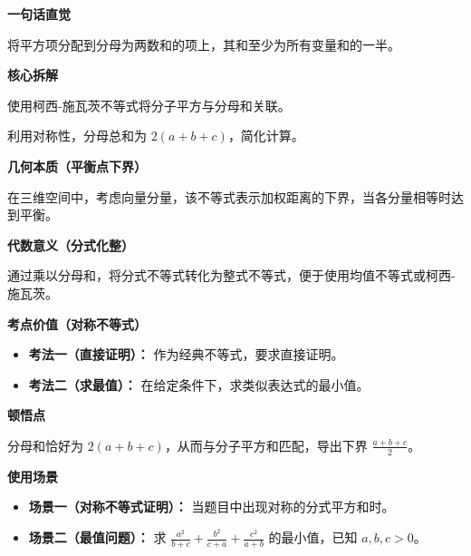 \begin{explanationbox}
\textbf{\textcolor{CExplanation}{一句话直觉}}

将平方项分配到分母为两数和的项上，其和至少为所有变量和的一半。

\medskip
\textbf{\textcolor{CExplanation}{核心拆解}}
\begin{description}[style=nextline, leftmargin=2.8em, labelsep=0.5em, itemsep=0.45em]
    \item[\textbf{要点一（柯西-施瓦茨应用）：}] 使用柯西-施瓦茨不等式将分子平方与分母和关联。
    \item[\textbf{要点二（对称性简化）：}] 利用对称性，分母总和为 $2(a+b+c)$，简化计算。
\end{description}

\medskip
\textbf{\textcolor{CExplanation}{几何本质（平衡点下界）}}

在三维空间中，考虑向量分量，该不等式表示加权距离的下界，当各分量相等时达到平衡。

\medskip
\textbf{\textcolor{CExplanation}{代数意义（分式化整）}}

通过乘以分母和，将分式不等式转化为整式不等式，便于使用均值不等式或柯西-施瓦茨。

\medskip
\textbf{\textcolor{CExplanation}{考点价值（对称不等式）}}
\begin{itemize}[leftmargin=*, itemsep=0.5em, topsep=0.4em]
    \item \textbf{考法一（直接证明）：} 作为经典不等式，要求直接证明。
    \item \textbf{考法二（求最值）：} 在给定条件下，求类似表达式的最小值。
\end{itemize}

\medskip
\textbf{\textcolor{CExplanation}{顿悟点}}

分母和恰好为 $2(a+b+c)$，从而与分子平方和匹配，导出下界 $\frac{a+b+c}{2}$。

\medskip
\textbf{\textcolor{CExplanation}{使用场景}}
\begin{itemize}[leftmargin=*, itemsep=0.5em, topsep=0.4em]
    \item \textbf{场景一（对称不等式证明）：} 当题目中出现对称的分式平方和时。
    \item \textbf{场景二（最值问题）：} 求 $\frac{a^2}{b+c} + \frac{b^2}{c+a} + \frac{c^2}{a+b}$ 的最小值，已知 $a,b,c>0$。
\end{itemize}
\end{explanationbox}
